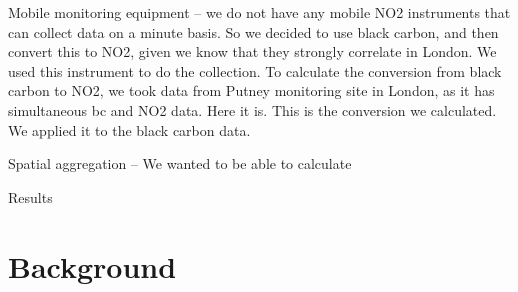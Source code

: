 Mobile monitoring equipment -- we do not have any mobile NO2 instruments that can collect data on a minute basis. So we decided to use black carbon, and then convert this to NO2, given we know that they strongly correlate in London. We used this instrument to do the collection. To calculate the conversion from black carbon to NO2, we took data from Putney monitoring site in London, as it has simultaneous bc and NO2 data. Here it is. This is the conversion we calculated. We applied it to the black carbon data.

Spatial aggregation -- We wanted to be able to calculate

Results







\section{Background}
\label{sec:4background}

